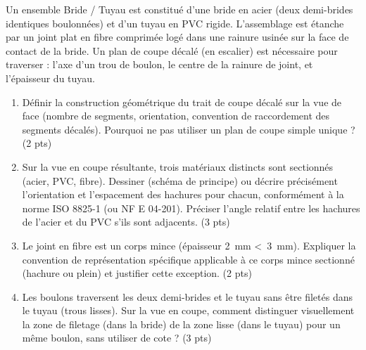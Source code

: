 \documentclass[11pt]{article}
\begin{document}
\begin{exercice}
Un ensemble \og Bride / Tuyau \fg est constitué d'une bride en acier (deux demi-brides identiques boulonnées) et d'un tuyau en PVC rigide. L'assemblage est étanche par un joint plat en fibre comprimée logé dans une rainure usinée sur la face de contact de la bride. Un plan de coupe décalé (en escalier) est nécessaire pour traverser : l'axe d'un trou de boulon, le centre de la rainure de joint, et l'épaisseur du tuyau.
\begin{enumerate}
    \item Définir la construction géométrique du trait de coupe décalé sur la vue de face (nombre de segments, orientation, convention de raccordement des segments décalés). Pourquoi ne pas utiliser un plan de coupe simple unique ? (2 pts)
    \item Sur la vue en coupe résultante, trois matériaux distincts sont sectionnés (acier, PVC, fibre). Dessiner (schéma de principe) ou décrire précisément l'orientation et l'espacement des hachures pour chacun, conformément à la norme ISO 8825-1 (ou NF E 04-201). Préciser l'angle relatif entre les hachures de l'acier et du PVC s'ils sont adjacents. (3 pts)
    \item Le joint en fibre est un corps mince (épaisseur \SI{2}{mm} \textless\ \SI{3}{mm}). Expliquer la convention de représentation spécifique applicable à ce corps mince sectionné (hachure ou plein) et justifier cette exception. (2 pts)
    \item Les boulons traversent les deux demi-brides et le tuyau sans être filetés dans le tuyau (trous lisses). Sur la vue en coupe, comment distinguer visuellement la zone de filetage (dans la bride) de la zone lisse (dans le tuyau) pour un même boulon, sans utiliser de cote ? (3 pts)
\end{enumerate}
\end{exercice}
\end{document}
